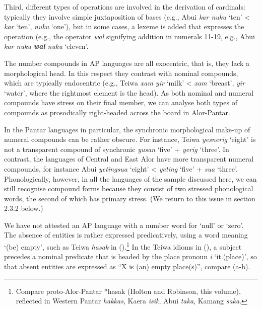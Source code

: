 Third, different types of operations are involved in the derivation of cardinals: typically they involve simple juxtaposition of bases (e.g., Abui \textit{kar nuku} {\textquoteleft}ten{\textquoteright} {\textless} \textit{kar} {\textquoteleft}ten{\textquoteright}, \textit{nuku} {\textquoteleft}one{\textquoteright}), but in some cases, a lexeme is added that expresses the operation (e.g., the operator \textit{wal} signifying addition in numerals 11-19, e.g., Abui \textit{kar nuku }\textbf{\textit{wal}}\textit{ nuku} {\textquoteleft}eleven{\textquoteright}. 

The number compounds in AP languages are all exocentric, that is, they lack a morphological head. In this respect they contrast with nominal compounds, which are typically endocentric (e.g., Teiwa \textit{xam yir} {\textquoteleft}milk{\textquoteright} {\textless} \textit{xam} {\textquoteleft}breast{\textquoteright}, \textit{yir} {\textquoteleft}water{\textquoteright}, where the rightmost element is the head). As both nominal and numeral compounds have stress on their final member, we can analyse both types of compounds as prosodically right-headed across the board in Alor-Pantar. 

In the Pantar languages in particular, the synchronic morphological make-up of numeral compounds can be rather obscure. For instance, Teiwa \textit{yesnerig} {\textquoteleft}eight{\textquoteright} is not a transparent compound of synchronic \textit{yusan} {\textquoteleft}five{\textquoteright} + \textit{yerig} {\textquoteleft}three{\textquoteright}. In contrast, the languages of Central and East Alor have more transparent numeral compounds, for instance Abui \textit{yetingsua} {\textquoteleft}eight{\textquoteright} {\textless} \textit{yeting} {\textquoteleft}five{\textquoteright} + \textit{sua} {\textquoteleft}three{\textquoteright}. Phonologically, however, in all the languages of the sample discussed here, we can still recognise compound forms because they consist of two stressed phonological words, the second of which has primary stress. (We return to this issue in section 2.3.2 below.) 

We have not attested an AP language with a number word for {\textquoteleft}null{\textquoteright} or {\textquoteleft}zero{\textquoteright}. The absence of entities is rather expressed predicatively, using a word meaning {\textquoteleft}(be) empty{\textquoteright}, such as Teiwa \textit{hasak} in ().\footnote{ Compare proto-Alor-Pantar *hasak (Holton and Robinson, this volume), reflected in Western Pantar \textit{hakkas}, Kaera \textit{isik}, Abui \textit{taka}, Kamang \textit{saka}.} In the Teiwa idioms in (), a subject precedes a nominal predicate that is headed by the place pronoun \textit{i} {\textquoteleft}it.(place){\textquoteright}, so that absent entities are expressed as {\textquotedblleft}X is (an) empty place(s){\textquotedblright}, compare (a-b).

